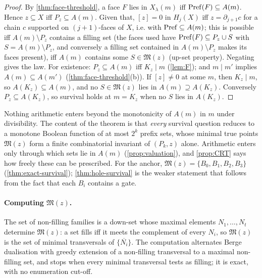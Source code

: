 \begin{proof}
By \cref{thm:face-threshold}, a face $F$ lies in $X_\lambda(m)$ iff $\mathrm{Pref}(F)\subseteq A(m)$. Hence $z\subseteq X$ iff $P_z\subseteq A(m)$. Given that, $[z]=0$ in $H_j(X)$ iff $z=\partial_{j+1}c$ for a chain $c$ supported on $(j{+}1)$-faces of $X$, i.e. with $\mathrm{Pref}\subseteq A(m)$; this is possible iff $A(m)\setminus P_z$ contains a filling set (the faces used have $\mathrm{Pref}(F)\subseteq P_z\cup S$ with $S=A(m)\setminus P_z$, and conversely a filling set contained in $A(m)\setminus P_z$ makes its faces present), iff $A(m)$ contains some $S\in\mathfrak M(z)$ (up-set property). Negating gives the law.
For existence: $P_z\subseteq A(m)$ iff $K_z\mid m$ (\cref{lem:F}); and $m\mid m'$ implies $A(m)\subseteq A(m')$ (\cref{thm:face-threshold}(b)). If $[z]\ne0$ at some $m$, then $K_z\mid m$, so $A(K_z)\subseteq A(m)$, and no $S\in\mathfrak M(z)$ lies in $A(m)\supseteq A(K_z)$. Conversely $P_z\subseteq A(K_z)$, so survival holds at $m=K_z$ when no $S$ lies in $A(K_z)$.
\end{proof}
Nothing arithmetic enters beyond the monotonicity of $A(m)$ in $m$ under divisibility. The content of the theorem is that \emph{every} survival question reduces to a monotone Boolean function of at most $2^k$ prefix sets, whose minimal true points $\mathfrak M(z)$ form a finite combinatorial invariant of $(P_k,z)$ alone. Arithmetic enters only through which sets lie in $A(m)$ (\cref{prop:valuation}), and \cref{prop:CRT} says how freely these can be prescribed. For the anchor, $\mathfrak M(z)=\{B_0,B_1,B_2,B_3\}$ (\cref{thm:exact-survival}); \cref{thm:hole-survival} is the weaker statement that follows from the fact that each $B_i$ contains a gate.

\paragraph{Computing $\mathfrak M(z)$.} The set of non-filling families is a down-set whose maximal elements $N_1,\dots,N_t$ determine $\mathfrak M(z)$: a set fills iff it meets the complement of every $N_i$, so $\mathfrak M(z)$ is the set of minimal transversals of $\{\overline{N_i}\}$. The computation alternates Berge dualisation with greedy extension of a non-filling transversal to a maximal non-filling set, and stops when every minimal transversal tests as filling; it is exact, with no enumeration cut-off.

